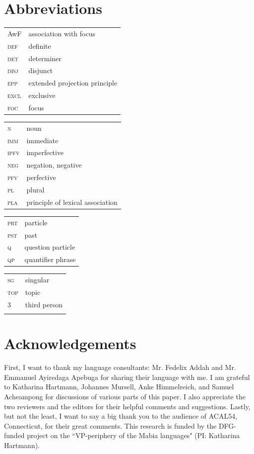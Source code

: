 \documentclass[output=paper,colorlinks,citecolor=brown,draftmode
]{langscibook}
\begin{document}
\section*{Abbreviations}
\begin{tabularx}{.45\textwidth}{lQ}
AwF & association with focus\\
\textsc{def} & definite\\
\textsc{det} & determiner\\
\textsc{disj} & disjunct\\
\textsc{epp} & extended projection principle\\
\textsc{excl} & exclusive\\
\textsc{foc} & focus\\
\end{tabularx}
\begin{tabularx}{.45\textwidth}{lQ}
\textsc{n} & noun\\
\textsc{imm} & immediate \\
\textsc{ipfv} & imperfective\\
\textsc{neg} & negation, negative\\
\textsc{pfv} & perfective\\
\textsc{pl} & plural\\
\textsc{pla} & principle of lexical association\\
\end{tabularx}

\begin{tabularx}{.45\textwidth}{lQ}
\textsc{prt} & particle\\
\textsc{pst} & past\\
\textsc{q} & question particle\\
\textsc{qp} & quantifier phrase\\
\end{tabularx}
\begin{tabularx}{.45\textwidth}{lQ}
\textsc{sg} & singular\\
\textsc{top} & topic\\
3 & third person\\
\\
\end{tabularx}


\section*{Acknowledgements}
First, I want to thank my language consultants: Mr. Fedelix Addah and Mr. Emmanuel Ayiredaga Apebuga for sharing their language with me. I am grateful to Katharina Hartmann, Johannes Mursell, Anke Himmelreich, and Samuel Acheampong for discussions of various parts of this paper. I also appreciate the two reviewers and the editors for their helpful comments and suggestions. Lastly, but not the least, I want to say a big thank you to the audience of ACAL54, Connecticut, for their great comments. This research is funded by the DFG-funded project on the ``VP-periphery of the Mabia languages" (PI: Katharina Hartmann). 


\sloppy %

\printbibliography[heading=subbibliography,notkeyword=this]
\end{document}
